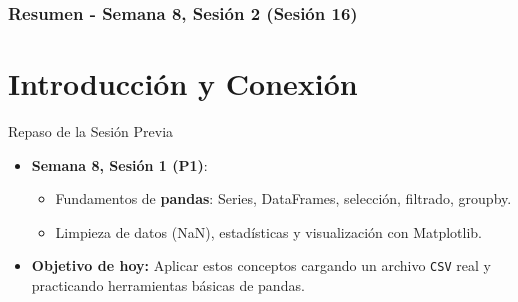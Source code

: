 \documentclass[10pt]{beamer}
\begin{document}
\myfront{}

\begin{frame}
  \titlepage
\end{frame}

\begin{frame}
  \frametitle{Resumen - Semana 8, Sesión 2 (Sesión 16)}
  \tableofcontents
\end{frame}


\section{Introducción y Conexión}

\begin{frame}{Repaso de la Sesión Previa}
  \begin{itemize}
    \item \textbf{Semana 8, Sesión 1 (P1)}:
      \begin{itemize}
        \item Fundamentos de \textbf{pandas}: Series, DataFrames, selección, filtrado, groupby.
        \item Limpieza de datos (NaN), estadísticas y visualización con Matplotlib.
      \end{itemize}
    \item \textbf{Objetivo de hoy:} Aplicar estos conceptos cargando un archivo \texttt{CSV} real y practicando herramientas básicas de pandas.
  \end{itemize}
\end{frame}
\end{document}
